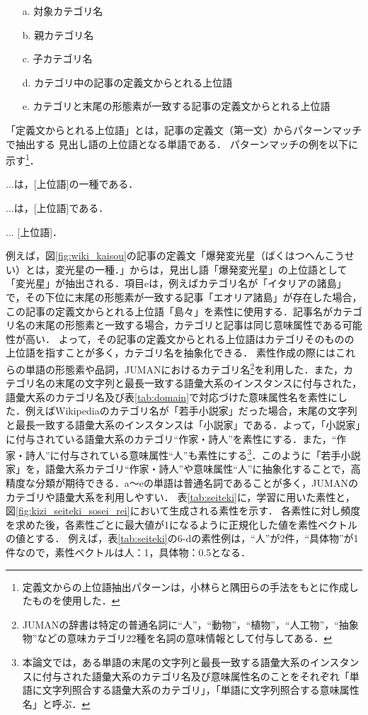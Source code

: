 \documentclass[japanese]{jnlp_1.4}
\begin{document}
\begin{itemize}
\item[a.]
対象カテゴリ名
\item[b.]
親カテゴリ名
\item[c.]
子カテゴリ名
\item[d.]
カテゴリ中の記事の定義文からとれる上位語
\item[e.]
カテゴリと末尾の形態素が一致する記事の定義文からとれる上位語
\end{itemize}

\noindent
「定義文からとれる上位語」とは，記事の定義文（第一文）からパターンマッチで抽出する
見出し語の上位語となる単語である．
パターンマッチの例を以下に示す\footnote{定義文からの上位語抽出パターンは，小林ら\citeyear{Kobayashi}と隅田ら\citeyear{Sumida}の手法をもとに作成したものを使用した．}．

...は，[上位語]の一種である．\par
...は，[上位語]である．\par
... [上位語]．

\noindent 例えば，図\ref{fig:wiki_kaisou}の記事の定義文「爆発変光星（ばくはつへんこうせい）とは，変光星の一種．」からは，見出し語「爆発変光星」の上位語として「変光星」が抽出される．項目eは，例えばカテゴリ名が「イタリアの諸島」で，その下位に末尾の形態素が一致する記事「エオリア諸島」が存在した場合，この記事の定義文からとれる上位語「島々」を素性に使用する．記事名がカテゴリ名の末尾の形態素と一致する場合，カテゴリと記事は同じ意味属性である可能性が高い．
よって，その記事の定義文からとれる上位語はカテゴリそのものの上位語を指すことが多く，カテゴリ名を抽象化できる．
素性作成の際にはこれらの単語の形態素や品詞，JUMANにおけるカテゴリ名\footnote{JUMANの辞書は特定の普通名詞に``人''，``動物''，``植物''，``人工物''，``抽象物''などの意味カテゴリ22種を名詞の意味情報として付与してある．}を利用した．また，カテゴリ名の末尾の文字列と最長一致する語彙大系のインスタンスに付与された，語彙大系のカテゴリ名及び表\ref{tab:domain}で対応づけた意味属性名を素性にした．例えばWikipediaのカテゴリ名が「若手小説家」だった場合，末尾の文字列と最長一致する語彙大系のインスタンスは「小説家」である．よって，「小説家」に付与されている語彙大系のカテゴリ``作家・詩人''を素性にする．また，``作家・詩人''に付与されている意味属性``人''も素性にする\footnote{本論文では，ある単語の末尾の文字列と最長一致する語彙大系のインスタンスに付与された語彙大系のカテゴリ名及び意味属性名のことをそれぞれ「単語に文字列照合する語彙大系のカテゴリ」，「単語に文字列照合する意味属性名」と呼ぶ．}．このように「若手小説家」を，語彙大系カテゴリ``作家・詩人''や意味属性``人''に抽象化することで，高精度な分類が期待できる．a〜eの単語は普通名詞であることが多く，JUMANのカテゴリや語彙大系を利用しやすい．
表\ref{tab:seiteki}に，学習に用いた素性と，図\ref{fig:kizi_seiteki_sosei_rei}において生成される素性を示す．
各素性に対し頻度を求めた後，各素性ごとに最大値が1になるように正規化した値を素性ベクトルの値とする．
例えば，表\ref{tab:seiteki}の6-dの素性例は，``人''が2件，``具体物''が1件なので，素性ベクトルは人：1，具体物：0.5となる．
\end{document}

